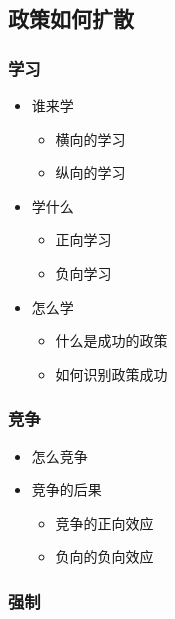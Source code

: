 \documentclass[
  12pt,
]{ctexart}
\begin{document}
\hypertarget{ux653fux7b56ux5982ux4f55ux6269ux6563}{%
\subsection{政策如何扩散}\label{ux653fux7b56ux5982ux4f55ux6269ux6563}}

\hypertarget{ux5b66ux4e60}{%
\subsubsection{学习}\label{ux5b66ux4e60}}

\begin{itemize}
\item
  谁来学

  \begin{itemize}
  \item
    横向的学习
  \item
    纵向的学习
  \end{itemize}
\item
  学什么

  \begin{itemize}
  \item
    正向学习
  \item
    负向学习
  \end{itemize}
\item
  怎么学

  \begin{itemize}
  \item
    什么是成功的政策
  \item
    如何识别政策成功
  \end{itemize}
\end{itemize}

\hypertarget{ux7adeux4e89}{%
\subsubsection{竞争}\label{ux7adeux4e89}}

\begin{itemize}
\item
  怎么竞争
\item
  竞争的后果

  \begin{itemize}
  \item
    竞争的正向效应
  \item
    负向的负向效应
  \end{itemize}
\end{itemize}

\hypertarget{ux5f3aux5236}{%
\subsubsection{强制}\label{ux5f3aux5236}}
\end{document}
